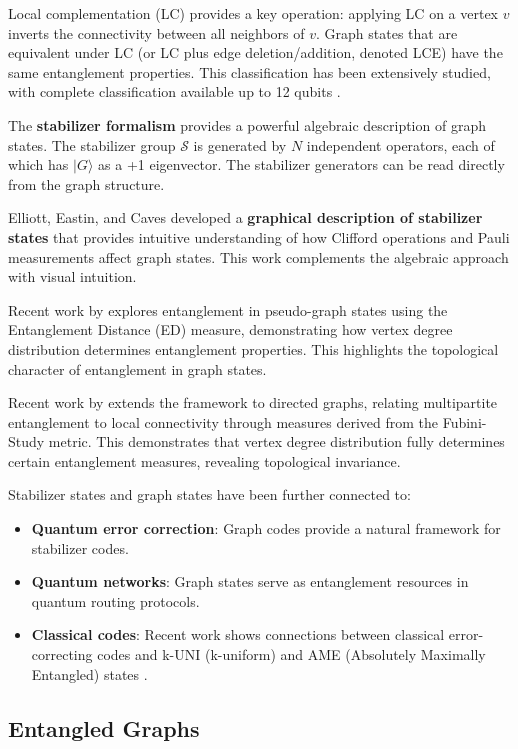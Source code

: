 \documentclass[12pt,a4paper]{article}
\begin{document}
Local complementation (LC) provides a key operation: applying LC on a vertex $v$ inverts the connectivity between all neighbors of $v$. Graph states that are equivalent under LC (or LC plus edge deletion/addition, denoted LCE) have the same entanglement properties. This classification has been extensively studied, with complete classification available up to 12 qubits \cite{hein2004entanglement,danielsen2008graph}.

The \textbf{stabilizer formalism} provides a powerful algebraic description of graph states. The stabilizer group $\mathcal{S}$ is generated by $N$ independent operators, each of which has $|G\rangle$ as a +1 eigenvector. The stabilizer generators can be read directly from the graph structure.

Elliott, Eastin, and Caves developed a \textbf{graphical description of stabilizer states} that provides intuitive understanding of how Clifford operations and Pauli measurements affect graph states. This work complements the algebraic approach with visual intuition.

Recent work by \cite{Frasso2024} explores entanglement in pseudo-graph states using the Entanglement Distance (ED) measure, demonstrating how vertex degree distribution determines entanglement properties. This highlights the topological character of entanglement in graph states.

Recent work by \cite{DirectedGraphs2025} extends the framework to directed graphs, relating multipartite entanglement to local connectivity through measures derived from the Fubini-Study metric. This demonstrates that vertex degree distribution fully determines certain entanglement measures, revealing topological invariance.

Stabilizer states and graph states have been further connected to:
\begin{itemize}
	\item \textbf{Quantum error correction}: Graph codes provide a natural framework for stabilizer codes.
	\item \textbf{Quantum networks}: Graph states serve as entanglement resources in quantum routing protocols.
	\item \textbf{Classical codes}: Recent work shows connections between classical error-correcting codes and k-UNI (k-uniform) and AME (Absolutely Maximally Entangled) states \cite{Raissi2021}.
\end{itemize}

\subsection{Entangled Graphs}
\label{sec:entangled-graphs}
\end{document}
